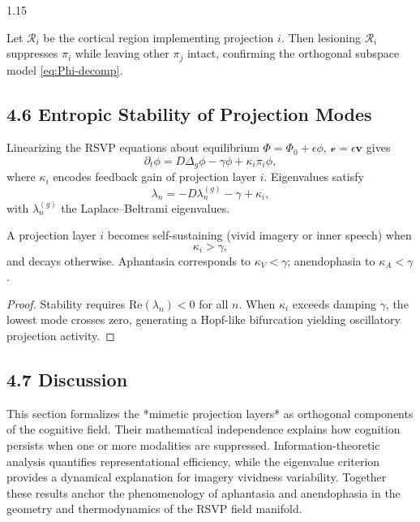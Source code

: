 \documentclass[12pt,a4paper]{article}
\begin{document}
\begin{spacing}{1.15}
\begin{proposition}
Let $\mathcal{R}_i$ be the cortical region implementing projection $i$.  
Then lesioning $\mathcal{R}_i$ suppresses $\pi_i$ while leaving other $\pi_j$ intact, confirming the orthogonal subspace model \eqref{eq:Phi-decomp}.
\end{proposition}

\subsection{4.6 Entropic Stability of Projection Modes}

Linearizing the RSVP equations about equilibrium $\Phi=\Phi_0+\epsilon\phi$, $\boldsymbol{\mathcal v}=\epsilon\mathbf{v}$ gives
\[
\partial_t\phi=D\Delta_g\phi-\gamma\phi+\kappa_i\pi_i\phi,
\]
where $\kappa_i$ encodes feedback gain of projection layer $i$.  
Eigenvalues satisfy
\[
\lambda_n=-D\lambda_n^{(g)}-\gamma+\kappa_i,
\]
with $\lambda_n^{(g)}$ the Laplace–Beltrami eigenvalues.

\begin{theorem}
A projection layer $i$ becomes self-sustaining (vivid imagery or inner speech) when
\[
\kappa_i>\gamma,
\]
and decays otherwise.  
Aphantasia corresponds to $\kappa_V<\gamma$; anendophasia to $\kappa_A<\gamma$.
\end{theorem}

\begin{proof}
Stability requires $\mathrm{Re}(\lambda_n)<0$ for all $n$.  
When $\kappa_i$ exceeds damping $\gamma$, the lowest mode crosses zero, generating a Hopf-like bifurcation yielding oscillatory projection activity.
\end{proof}

\subsection{4.7 Discussion}

This section formalizes the *mimetic projection layers* as orthogonal components of the cognitive field.  
Their mathematical independence explains how cognition persists when one or more modalities are suppressed.  
Information-theoretic analysis quantifies representational efficiency, while the eigenvalue criterion provides a dynamical explanation for imagery vividness variability.  
Together these results anchor the phenomenology of aphantasia and anendophasia in the geometry and thermodynamics of the RSVP field manifold.


\end{spacing}
\end{document}
